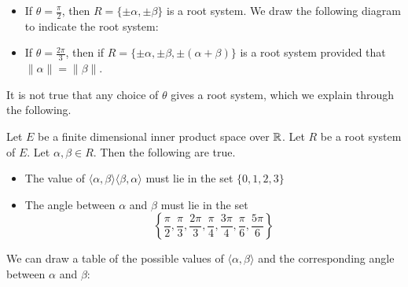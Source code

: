 \documentclass[a4paper]{article}
\begin{document}
\begin{itemize}
\item If $\theta=\frac{\pi}{2}$, then $R=\{\pm\alpha,\pm\beta\}$ is a root system. We draw the following diagram to indicate the root system: 
\item If $\theta=\frac{2\pi}{3}$, then if $R=\{\pm\alpha,\pm\beta,\pm(\alpha+\beta)\}$ is a root system provided that $\|\alpha\|=\|\beta\|$. 
\end{itemize}

It is not true that any choice of $\theta$ gives a root system, which we explain through the following. 

\begin{lmm}{}{} Let $E$ be a finite dimensional inner product space over $\mathbb{R}$. Let $R$ be a root system of $E$. Let $\alpha,\beta\in R$. Then the following are true. 
\begin{itemize}
\item The value of $\langle\alpha,\beta\rangle\langle\beta,\alpha\rangle$ must lie in the set $\{0,1,2,3\}$
\item The angle between $\alpha$ and $\beta$ must lie in the set $$\left\{\frac{\pi}{2},\frac{\pi}{3},\frac{2\pi}{3},\frac{\pi}{4},\frac{3\pi}{4},\frac{\pi}{6},\frac{5\pi}{6}\right\}$$
\end{itemize}
\end{lmm}

We can draw a table of the possible values of $\langle\alpha,\beta\rangle$ and the corresponding angle between $\alpha$ and $\beta$: 
\end{document}
